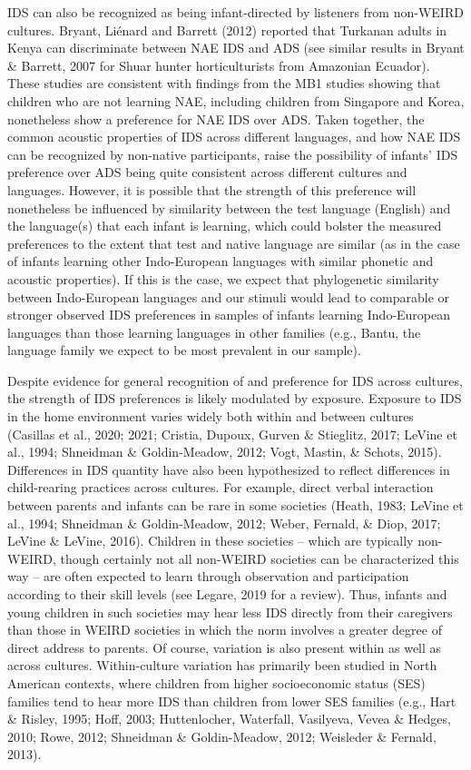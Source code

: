 \documentclass[
  ,man,floatsintext]{apa6}
\begin{document}
IDS can also be recognized as being infant-directed by listeners from non-WEIRD cultures. Bryant, Liénard and Barrett (2012) reported that Turkanan adults in Kenya can discriminate between NAE IDS and ADS (see similar results in Bryant \& Barrett, 2007 for Shuar hunter horticulturists from Amazonian Ecuador). These studies are consistent with findings from the MB1 studies showing that children who are not learning NAE, including children from Singapore and Korea, nonetheless show a preference for NAE IDS over ADS. Taken together, the common acoustic properties of IDS across different languages, and how NAE IDS can be recognized by non-native participants, raise the possibility of infants' IDS preference over ADS being quite consistent across different cultures and languages. However, it is possible that the strength of this preference will nonetheless be influenced by similarity between the test language (English) and the language(s) that each infant is learning, which could bolster the measured preferences to the extent that test and native language are similar (as in the case of infants learning other Indo-European languages with similar phonetic and acoustic properties). If this is the case, we expect that phylogenetic similarity between Indo-European languages and our stimuli would lead to comparable or stronger observed IDS preferences in samples of infants learning Indo-European languages than those learning languages in other families (e.g., Bantu, the language family we expect to be most prevalent in our sample).

Despite evidence for general recognition of and preference for IDS across cultures, the strength of IDS preferences is likely modulated by exposure. Exposure to IDS in the home environment varies widely both within and between cultures (Casillas et al., 2020; 2021; Cristia, Dupoux, Gurven \& Stieglitz, 2017; LeVine et al., 1994; Shneidman \& Goldin-Meadow, 2012; Vogt, Mastin, \& Schots, 2015). Differences in IDS quantity have also been hypothesized to reflect differences in child-rearing practices across cultures. For example, direct verbal interaction between parents and infants can be rare in some societies (Heath, 1983; LeVine et al., 1994; Shneidman \& Goldin-Meadow, 2012; Weber, Fernald, \& Diop, 2017; LeVine \& LeVine, 2016). Children in these societies -- which are typically non-WEIRD, though certainly not all non-WEIRD societies can be characterized this way -- are often expected to learn through observation and participation according to their skill levels (see Legare, 2019 for a review). Thus, infants and young children in such societies may hear less IDS directly from their caregivers than those in WEIRD societies in which the norm involves a greater degree of direct address to parents. Of course, variation is also present within as well as across cultures. Within-culture variation has primarily been studied in North American contexts, where children from higher socioeconomic status (SES) families tend to hear more IDS than children from lower SES families (e.g., Hart \& Risley, 1995; Hoff, 2003; Huttenlocher, Waterfall, Vasilyeva, Vevea \& Hedges, 2010; Rowe, 2012; Shneidman \& Goldin-Meadow, 2012; Weisleder \& Fernald, 2013).
\end{document}
